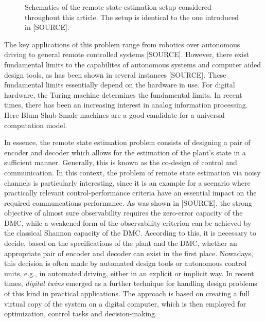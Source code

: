 \documentclass[conference]{IEEEtran}
\newcommand{\rys}{(\mathsf{y}_t)_{t\in\NN}}
\newcommand{\rshs}{(\hat{\mathsf{s}}_t)_{t\in\NN}}
\def\D{{\mathcal D}}
\def\NN{{\mathbb N}}
\newcommand{\sdummy}{{\color{red}[SOURCE]}}
\begin{document}
\begin{figure}
		\caption{Schematics of the remote state estimation setup considered throughout this article. The setup is identical to the one introduced in \sdummy.}
		\label{fig:Schematics}
	\end{figure}
	The key applications of this problem range from robotics over autonomous driving to general remote controlled systems \sdummy. However, there exist fundamental 
	limits to the capabilites of autonomous systems and computer aided design tools, as has been shown in several instances \sdummy. These fundamental limits essentially
	depend on the hardware in use. For digital hardware, the Turing machine determines the fundamental limits. In recent times, there has been an increasing interest in analog information processing.
	Here Blum-Shub-Smale machines are a good candidate for a universal computation model.
	
	In essence, the remote state estimation problem consists of designing a pair of encoder and decoder which allows for the estimation of the plant's state in a sufficient manner.
	Generally, this is known as the co-design of control and communication. In this context, the problem of remote state estimation via noisy channels is particularly interesting,
	since it is an example for a scenario where practically relevant control-performance criteria have an essential impact on the required communcations performance.
	As was shown in \sdummy, the strong objective of almost sure observability requires the zero-error capacity of the DMC, while a weakened form of the observability criterion can be achieved
	by the classical Shannon capacity of the DMC.
	According to this, it is necessary to decide, based on the specifications of the plant and the DMC, whether an appropriate pair of encoder and decoder can exist in the first place. 
	Nowadays, this decision is often made by automated design tools or autonomous control units, e.g., in automated driving, either in an explicit or implicit way. In recent times, 
	\emph{digital twins} emerged as a further technique for handling design problems of this kind in practical applications. The approach is based on creating a full virtual copy of 
	the system on a digital computer, which is then employed for optimization, control tasks and decision-making. 
\end{document}
